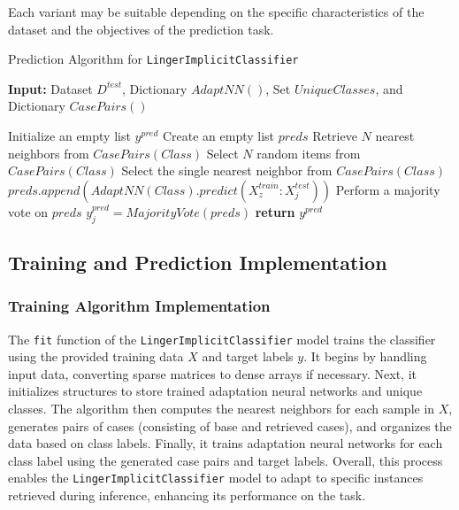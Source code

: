 \documentclass[a4paper, 12pt]{report}
\begin{document}
Each variant may be suitable depending on the specific characteristics of the dataset and the objectives of the prediction task.
\begin{algorithm}[H]
    \caption{Prediction Algorithm for \texttt{LingerImplicitClassifier}}
    \label{alg:LingerImplicitClassifier_predict}
    \textbf{Input:} Dataset $D^{test}$, Dictionary $AdaptNN()$, Set $UniqueClasses$, and Dictionary $CasePairs()$
    \begin{algorithmic}
        \State Initialize an empty list $y^{pred}$
            \State Create an empty list $preds$
                    \State Retrieve $N$ nearest neighbors from $CasePairs(Class)$
                    \State Select $N$ random items from $CasePairs(Class)$
                    \State Select the single nearest neighbor from $CasePairs(Class)$
                \EndIf
                        \State $preds.append(AdaptNN(Class).predict(X^{train}_z:X^{test}_j))$
                    \EndFor
                \EndFor
                \State Perform a majority vote on $preds$
                \State $y^{pred}_j = MajorityVote(preds)$
            \EndFor
        \EndFor
        \State \textbf{return} $y^{pred}$
    \end{algorithmic}
\end{algorithm}
\clearpage
\subsection{Training and Prediction Implementation}

\subsubsection{Training Algorithm Implementation}
\label{sec:training_implementation_LIC}
The \texttt{fit} function of the \texttt{LingerImplicitClassifier} model trains the classifier using the provided training data $X$ and target labels $y$. 
It begins by handling input data, converting sparse matrices to dense arrays if necessary. 
Next, it initializes structures to store trained adaptation neural networks and unique classes. 
The algorithm then computes the nearest neighbors for each sample in $X$, generates pairs of cases (consisting of base and retrieved cases), 
and organizes the data based on class labels. Finally, it trains adaptation neural networks for each class label using the generated case pairs and target labels. 
Overall, this process enables the \texttt{LingerImplicitClassifier} model to adapt to specific instances retrieved during inference, 
enhancing its performance on the task.
\end{document}
